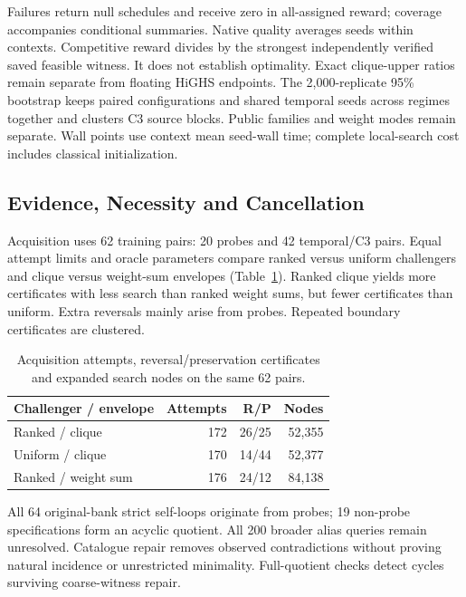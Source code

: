 Failures return null schedules and receive zero in all-assigned reward;
coverage accompanies conditional summaries. Native quality averages seeds
within contexts. Competitive reward divides by the strongest independently
verified saved feasible witness. It does not establish optimality. Exact
clique-upper ratios remain separate from floating HiGHS endpoints. The
2,000-replicate 95\% bootstrap keeps paired configurations and shared temporal
seeds across regimes together and clusters C3 source blocks. Public families
and weight modes remain separate. Wall points use context mean seed-wall time;
complete local-search cost includes classical initialization.

\subsection{Evidence, Necessity and Cancellation}
\label{sec:experiments:evidence}
Acquisition uses 62 training pairs: 20 probes and 42 temporal/C3 pairs.
Equal attempt limits and oracle parameters compare ranked versus
uniform challengers and clique versus weight-sum envelopes
(Table~\ref{tab:evidence-yield}). Ranked clique yields more certificates with
less search than ranked weight sums, but fewer certificates than uniform.
Extra reversals mainly arise from probes. Repeated boundary certificates
are clustered.

\begin{table}[t]
\centering
\caption{Acquisition attempts, reversal/preservation certificates and expanded
search nodes on the same 62 pairs.}
\label{tab:evidence-yield}
\small
\begin{tabular}{lrrr}
\toprule
Challenger / envelope & Attempts & R/P & Nodes \\
\midrule
Ranked / clique & 172 & 26/25 & 52,355 \\
Uniform / clique & 170 & 14/44 & 52,377 \\
Ranked / weight sum & 176 & 24/12 & 84,138 \\
\bottomrule
\end{tabular}
\end{table}

All 64 original-bank strict self-loops originate from probes; 19 non-probe
specifications form an acyclic quotient. All 200 broader alias queries remain
unresolved. Catalogue repair removes observed contradictions without proving
natural incidence or unrestricted minimality. Full-quotient checks detect
cycles surviving coarse-witness repair.

